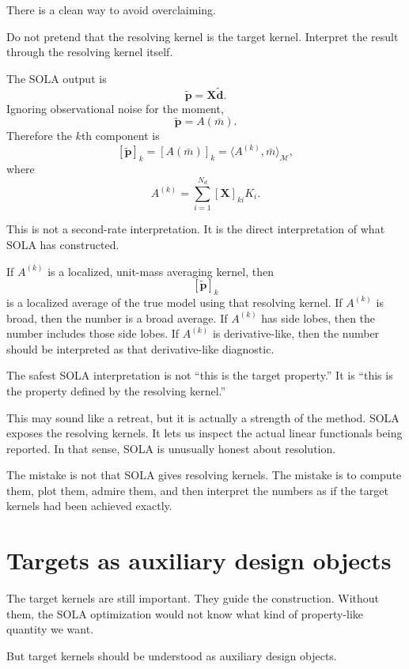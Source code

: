 \documentclass[11pt,openany]{book}
\theoremstyle{definition}
\theoremstyle{remark}
\newcommand{\M}{\mathcal M}
\begin{document}
There is a clean way to avoid overclaiming.

Do not pretend that the resolving kernel is the target kernel. Interpret the result through the
resolving kernel itself.

The SOLA output is
\[
  \widetilde{\mathbf p}
  =
  \mathbf X\widetilde{\mathbf d}.
\]
Ignoring observational noise for the moment,
\[
  \widetilde{\mathbf p}
  =
  A(\bar m).
\]
Therefore the \(k\)th component is
\[
  [\widetilde{\mathbf p}]_k
  =
  [A(\bar m)]_k
  =
  \langle A^{(k)},\bar m\rangle_{\M},
\]
where
\[
  A^{(k)}
  =
  \sum_{i=1}^{N_d}[\mathbf X]_{ki}K_i.
\]

This is not a second-rate interpretation. It is the direct interpretation of what SOLA has
constructed.

If \(A^{(k)}\) is a localized, unit-mass averaging kernel, then
\[
  [\widetilde{\mathbf p}]_k
\]
is a localized average of the true model using that resolving kernel. If \(A^{(k)}\) is broad, then
the number is a broad average. If \(A^{(k)}\) has side lobes, then the number includes those side
lobes. If \(A^{(k)}\) is derivative-like, then the number should be interpreted as that
derivative-like diagnostic.

\begin{lessonbox}
The safest SOLA interpretation is not ``this is the target property.'' It is ``this is the property
defined by the resolving kernel.''
\end{lessonbox}

This may sound like a retreat, but it is actually a strength of the method. SOLA exposes the
resolving kernels. It lets us inspect the actual linear functionals being reported. In that sense,
SOLA is unusually honest about resolution.

The mistake is not that SOLA gives resolving kernels. The mistake is to compute them, plot
them, admire them, and then interpret the numbers as if the target kernels had been achieved
exactly.

\section{Targets as auxiliary design objects}

The target kernels are still important. They guide the construction. Without them, the SOLA
optimization would not know what kind of property-like quantity we want.

But target kernels should be understood as auxiliary design objects.
\end{document}
